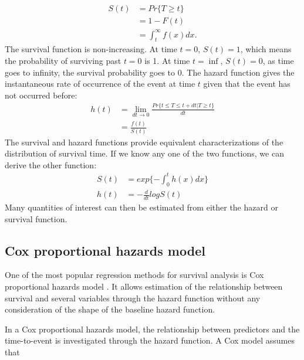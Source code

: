 \documentclass{article}
\numberwithin{equation}{section}
\begin{document}
\begin{equation}
\begin{split}
S(t) &= Pr\{T \geq t\} \\
     &=1-F(t) \\
     &=\int_{t}^{\infty} f(x)dx.  
\end{split}
\end{equation}
The survival function is non-increasing. At time $t=0$, $S(t) =1$, which means the probability of surviving past $t=0$ is 1. At time $t=\inf$, $S(t) =0$, as time goes to infinity, the survival probability goes to 0.
The hazard function gives the instantaneous rate of occurrence of the event at time $t$ given that the event has not occurred before:
\begin{equation}
\begin{split}
h(t) &= \lim_{dt \to 0} \frac{Pr\{t \leq T\leq t+dt|T\geq t\}}{dt} \\
     &= \frac{f(t)}{S(t)}
\end{split}
\end{equation}
The survival and hazard functions provide equivalent characterizations of the distribution of survival time. If we know any one of the two functions, we can derive the other function:
\begin{equation}
\begin{split}
S(t)&= exp\{-\int_{0}^{t}h(x)dx \} \\
h(t)&=-\frac{d}{dt}logS(t)
\end{split}
\end{equation}
Many quantities of interest can then be estimated from either the hazard or survival function. 




\subsection{Cox proportional hazards model}
One of the most popular regression methods for survival analysis is Cox proportional hazards model \cite{cox1972regression}. It allows estimation of  the relationship between survival and several variables through the hazard function without any consideration of the shape of the baseline hazard function. 

In a Cox proportional hazards model, the relationship between predictors and the time-to-event is investigated through the hazard function. A Cox model assumes that
\end{document}
